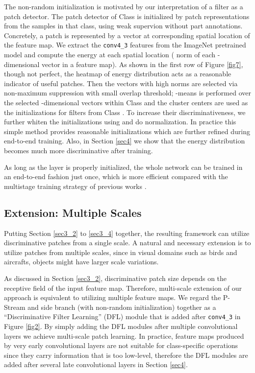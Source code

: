 \documentclass[10pt,twocolumn,letterpaper]{article}
\begin{document}
The non-random initialization is motivated by our interpretation of a  filter as a patch detector.
The patch detector of Class  is initialized by patch representations from the samples in
that class, using weak supervion without part annotations. Concretely, a patch is represented by a  vector
at corresponding spatial location of the feature map. We extract the
\texttt{conv4\_3} features from the ImageNet pretrained model and compute the
energy at each spatial location ( norm of each -dimensional vector in a feature map). As shown in
the first row of Figure \ref{fig7}, though not perfect, the heatmap of energy distribution acts as a reasonable indicator of useful
patches. Then the vectors with high  norms are selected via non-maximum suppression with small overlap threshold; -means
is performed over the selected -dimensional vectors within Class  and the
cluster centers are used as the initializations for filters from
Class . To increase their discriminativeness, we further whiten the initializations using \cite{ldadet} and do 
normalization. In practice this simple method provides reasonable initializations which are further refined during
end-to-end training. Also, in Section \ref{sec4} we show that the energy distribution becomes much more discriminative after training.

As long as the layer is properly initialized, the whole network can be trained in an end-to-end fashion just once, which is
more efficient compared with the multistage training strategy of previous works \cite{deeplac, spda_cnn, partstack}.

\subsection{Extension: Multiple Scales} \label{sec3_5}
Putting Section \ref{sec3_2} to \ref{sec3_4} together, the resulting framework can utilize discriminative patches
from a single scale. A natural and necessary extension is to utilize patches from multiple scales, since in visual
domains such as birds and aircrafts, objects might have larger scale variations.

As discussed in Section \ref{sec3_2}, discriminative patch size depends on the receptive field of
the input feature map. Therefore, multi-scale extension of our approach is equivalent to utilizing multiple feature
maps. We regard the P-Stream and side branch (with non-random initialization) together as a ``Discriminative Filter 
Learning'' (DFL) module that is added after \texttt{conv4\_3} in Figure \ref{fig2}. By simply
adding the DFL modules after multiple convolutional layers we achieve multi-scale patch learning. In practice,
feature maps produced by very early convolutional layers are not suitable for class-specific operations since
they carry information that is too low-level, therefore
the DFL modules are added after several late convolutional layers in Section \ref{sec4}.
\end{document}
